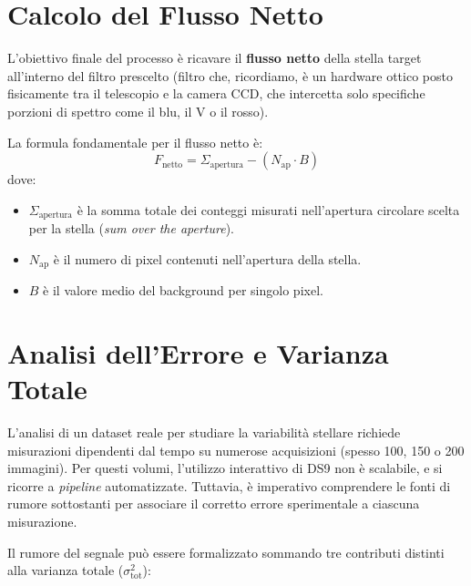 \section{Calcolo del Flusso Netto}

L'obiettivo finale del processo è ricavare il \textbf{flusso netto} della stella target all'interno del filtro prescelto (filtro che, ricordiamo, è un hardware ottico posto fisicamente tra il telescopio e la camera CCD, che intercetta solo specifiche porzioni di spettro come il blu, il V o il rosso).

La formula fondamentale per il flusso netto è:
\begin{equation}
F_{\text{netto}} = \Sigma_{\text{apertura}} - (N_{\text{ap}} \cdot B)
\end{equation}
dove:
\begin{itemize}
\item $\Sigma_{\text{apertura}}$ è la somma totale dei conteggi misurati nell'apertura circolare scelta per la stella (\textit{sum over the aperture}).
\item $N_{\text{ap}}$ è il numero di pixel contenuti nell'apertura della stella.
\item $B$ è il valore medio del background per singolo pixel.
\end{itemize}

\section{Analisi dell'Errore e Varianza Totale}

L'analisi di un dataset reale per studiare la variabilità stellare richiede misurazioni dipendenti dal tempo su numerose acquisizioni (spesso 100, 150 o 200 immagini). Per questi volumi, l'utilizzo interattivo di DS9 non è scalabile, e si ricorre a \textit{pipeline} automatizzate. Tuttavia, è imperativo comprendere le fonti di rumore sottostanti per associare il corretto errore sperimentale a ciascuna misurazione.

Il rumore del segnale può essere formalizzato sommando tre contributi distinti alla varianza totale ($\sigma_{\text{tot}}^2$):

